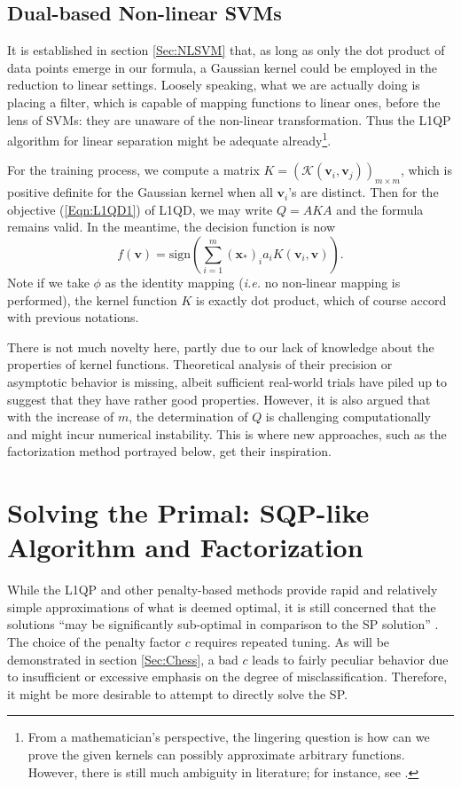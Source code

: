 \documentclass[11pt,a4paper]{article}
\theoremstyle{definition}
\renewcommand{\vec}[1]{\boldsymbol{#1}}
\begin{document}
    \subsection{Dual-based Non-linear SVMs\label{Sec:DbNLSVM}}
      It is established in section \ref{Sec:NLSVM} that, as long as only the dot product of data points emerge in our formula, a Gaussian kernel could be employed in the reduction to linear settings. Loosely speaking, what we are actually doing is placing a filter, which is capable of mapping functions to linear ones, before the lens of SVMs: they are unaware of the non-linear transformation. Thus the L1QP algorithm for linear separation might be adequate already\footnote{From a mathematician's perspective, the lingering question is how can we prove the given kernels can possibly approximate arbitrary functions. However, there is still much ambiguity in literature; for instance, see \cite{caputo2002appearance,vert2004primer}.}.

      For the training process, we compute a matrix $K=(\mathcal{K}(\vec{v}_{i},\vec{v}_{j}))_{m\times m}$, which is positive definite for the Gaussian kernel when all $\vec{v}_{i}$'s are distinct. Then for the objective (\ref{Eqn:L1QD1}) of L1QD, we may write $Q=AKA$ and the formula remains valid. In the meantime, the decision function is now
      \begin{equation}\label{Eqn:L1QPNLf}
        f(\vec{v})=\text{sign}(\sum_{i=1}^{m}(\vec{x}_{*})_{i}a_{i}K(\vec{v}_{i},\vec{v})).
      \end{equation}
      Note if we take $\phi$ as the identity mapping (\textit{i.e.} no non-linear mapping is performed), the kernel function $K$ is exactly dot product, which of course accord with previous notations.

      There is not much novelty here, partly due to our lack of knowledge about the properties of kernel functions. Theoretical analysis of their precision or asymptotic behavior is missing, albeit sufficient real-world trials have piled up to suggest that they have rather good properties. However, it is also argued \cite{fletcher2010binary} that with the increase of $m$, the determination of $Q$ is challenging computationally and might incur numerical instability. This is where new approaches, such as the factorization method portrayed below, get their inspiration.

  \section{Solving the Primal: SQP-like Algorithm and Factorization\label{Sec:SQP}}
    While the L1QP and other penalty-based methods provide rapid and relatively simple approximations of what is deemed optimal, it is still concerned that the solutions ``may be significantly sub-optimal in comparison to the SP solution'' \cite{fletcher2010binary}. The choice of the penalty factor $c$ requires repeated tuning. As will be demonstrated in section \ref{Sec:Chess}, a bad $c$ leads to fairly peculiar behavior due to insufficient or excessive emphasis on the degree of misclassification. Therefore, it might be more desirable to attempt to directly solve the SP.
\end{document}

